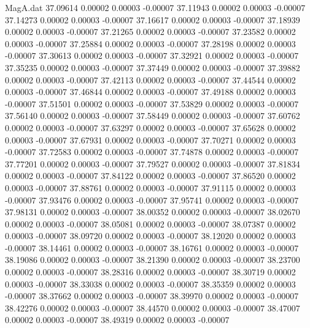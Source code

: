 \begin{filecontents}{MagA.dat}
  37.09614    0.00002    0.00003   -0.00007
  37.11943    0.00002    0.00003   -0.00007
  37.14273    0.00002    0.00003   -0.00007
  37.16617    0.00002    0.00003   -0.00007
  37.18939    0.00002    0.00003   -0.00007
  37.21265    0.00002    0.00003   -0.00007
  37.23582    0.00002    0.00003   -0.00007
  37.25884    0.00002    0.00003   -0.00007
  37.28198    0.00002    0.00003   -0.00007
  37.30613    0.00002    0.00003   -0.00007
  37.32921    0.00002    0.00003   -0.00007
  37.35235    0.00002    0.00003   -0.00007
  37.37449    0.00002    0.00003   -0.00007
  37.39882    0.00002    0.00003   -0.00007
  37.42113    0.00002    0.00003   -0.00007
  37.44544    0.00002    0.00003   -0.00007
  37.46844    0.00002    0.00003   -0.00007
  37.49188    0.00002    0.00003   -0.00007
  37.51501    0.00002    0.00003   -0.00007
  37.53829    0.00002    0.00003   -0.00007
  37.56140    0.00002    0.00003   -0.00007
  37.58449    0.00002    0.00003   -0.00007
  37.60762    0.00002    0.00003   -0.00007
  37.63297    0.00002    0.00003   -0.00007
  37.65628    0.00002    0.00003   -0.00007
  37.67931    0.00002    0.00003   -0.00007
  37.70271    0.00002    0.00003   -0.00007
  37.72583    0.00002    0.00003   -0.00007
  37.74878    0.00002    0.00003   -0.00007
  37.77201    0.00002    0.00003   -0.00007
  37.79527    0.00002    0.00003   -0.00007
  37.81834    0.00002    0.00003   -0.00007
  37.84122    0.00002    0.00003   -0.00007
  37.86520    0.00002    0.00003   -0.00007
  37.88761    0.00002    0.00003   -0.00007
  37.91115    0.00002    0.00003   -0.00007
  37.93476    0.00002    0.00003   -0.00007
  37.95741    0.00002    0.00003   -0.00007
  37.98131    0.00002    0.00003   -0.00007
  38.00352    0.00002    0.00003   -0.00007
  38.02670    0.00002    0.00003   -0.00007
  38.05081    0.00002    0.00003   -0.00007
  38.07387    0.00002    0.00003   -0.00007
  38.09720    0.00002    0.00003   -0.00007
  38.12020    0.00002    0.00003   -0.00007
  38.14461    0.00002    0.00003   -0.00007
  38.16761    0.00002    0.00003   -0.00007
  38.19086    0.00002    0.00003   -0.00007
  38.21390    0.00002    0.00003   -0.00007
  38.23700    0.00002    0.00003   -0.00007
  38.28316    0.00002    0.00003   -0.00007
  38.30719    0.00002    0.00003   -0.00007
  38.33038    0.00002    0.00003   -0.00007
  38.35359    0.00002    0.00003   -0.00007
  38.37662    0.00002    0.00003   -0.00007
  38.39970    0.00002    0.00003   -0.00007
  38.42276    0.00002    0.00003   -0.00007
  38.44570    0.00002    0.00003   -0.00007
  38.47007    0.00002    0.00003   -0.00007
  38.49319    0.00002    0.00003   -0.00007

\end{filecontents}
